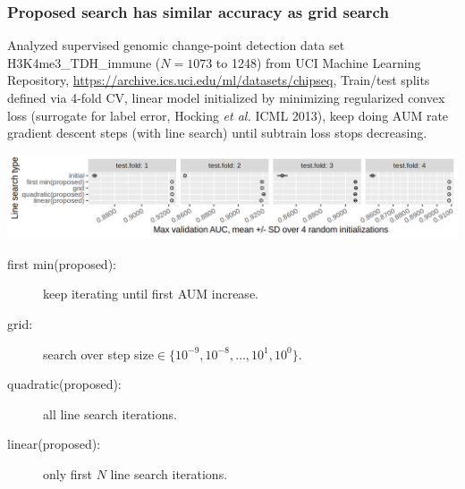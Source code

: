 \documentclass[t]{beamer}
\begin{document}
\begin{frame}
  \frametitle{Proposed search has similar accuracy as grid search}

  Analyzed supervised genomic change-point detection data set
  H3K4me3\_TDH\_immune ($N=1073$ to 1248)
  from UCI Machine Learning Repository,
  {\scriptsize \url{https://archive.ics.uci.edu/ml/datasets/chipseq},}
  Train/test splits defined via 4-fold CV, linear model initialized by
  minimizing regularized convex loss (surrogate for label error,
  Hocking \emph{et al.} ICML 2013), keep doing AUM rate gradient
  descent steps (with line search) until subtrain loss stops decreasing.

  \includegraphics[width=\textwidth]{figure-line-search-complexity-compare-H3K4me3_TDH_immune-equal_labels-rate-IntervalRegressionCV-initial}

  \begin{description}
  \item[first min(proposed):] keep iterating until first AUM
    increase.
  \item[grid:] search over step
    size$\in\{10^{-9},10^{-8},\dots,10^1,10^0\}$.
  \item[quadratic(proposed):] all line search iterations.
  \item[linear(proposed):] only first $N$ line search iterations.
  \end{description}
\end{frame}
\end{document}

